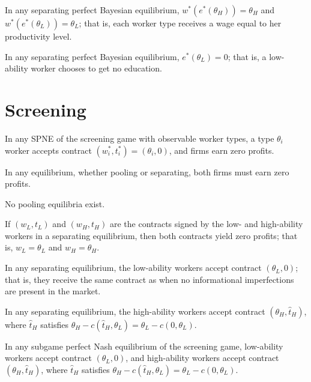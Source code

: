 \begin{lem}
    In any separating perfect Bayesian equilibrium, $w^*(e^*(\theta_H)) = \theta_H$ and $w^*(e^*(\theta_L)) = \theta_L$; that is, each worker type receives a wage equal to her productivity level.
\end{lem}

\begin{lem}
    In any separating perfect Bayesian equilibrium, $e^*(\theta_L) = 0$; that is, a low-ability worker chooses to get no education.
\end{lem}


\section{Screening}

\begin{prop}
    In any SPNE of the screening game with observable worker types, a type $\theta_i$ worker accepts contract $(w^*_i, t^*_i) = (\theta_i, 0)$, and firms earn zero profits.
\end{prop}

\begin{lem}
    In any equilibrium, whether pooling or separating, both firms must earn zero profits.
\end{lem}

\begin{lem}
    No pooling equilibria exist.
\end{lem}

\begin{lem}
    If $(w_L, t_L)$ and $(w_H, t_H)$ are the contracts signed by the low- and high-ability workers in a separating equilibrium, then both contracts yield zero profits; that is, $w_L = \theta_L$ and $w_H = \theta_H$.
\end{lem}

\begin{lem}
    In any separating equilibrium, the low-ability workers accept contract $(\theta_L, 0)$; that is, they receive the same contract as when no informational imperfections are present in the market.
\end{lem}

\begin{lem}
    In any separating equilibrium, the high-ability workers accept contract $(\theta_H, \hat{t}_H)$, where $\hat{t}_H$ satisfies $\theta_H - c(\hat{t}_H, \theta_L) = \theta_L - c(0, \theta_L)$.
\end{lem}

\begin{prop}
    In any subgame perfect Nash equilibrium of the screening game, low-ability workers accept contract $(\theta_L, 0)$, and high-ability workers accept contract $(\theta_H, \hat{t}_H)$, where $\hat{t}_H$ satisfies $\theta_H - c(\hat{t}_H, \theta_L) = \theta_L - c(0, \theta_L)$.
\end{prop}
